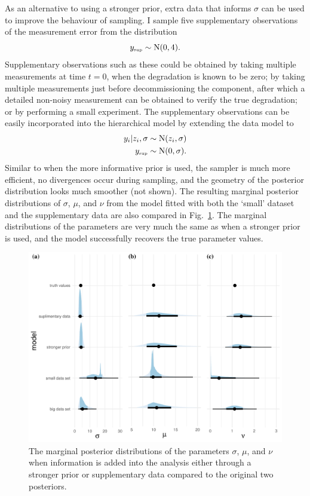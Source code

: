 As an alternative to using a stronger prior, extra data that informs $\sigma$ can be used to improve the behaviour of sampling. I sample five supplementary observations of the measurement error from the distribution
\begin{equation*}
 y_{\text{\tiny{sup}}} \sim \mbox{N}(0, 4).
\end{equation*}
Supplementary observations such as these could be obtained by taking multiple measurements at time $t = 0$, when the degradation is known to be zero; by taking multiple measurements just before decommissioning the component, after which a detailed non-noisy measurement can be obtained to verify the true degradation; or by performing a small experiment. The supplementary observations can be easily incorporated into the hierarchical model by extending the data model to
\begin{align*}
 y_i|z_i, \sigma & \sim \mbox{N}(z_i, \sigma) \\
 y_{\text{\tiny{sup}}} & \sim \mbox{N}(0, \sigma).
\end{align*}
Similar to when the more informative prior is used, the sampler is much more efficient, no divergences occur during sampling, and the geometry of the posterior distribution looks much smoother (not shown). The resulting marginal posterior distributions of $\sigma$, $\mu$, and $\nu$ from the model fitted with both the `small' dataset and the supplementary data are also compared in Fig.~\ref{fig:marginal-post-extra-info}. The marginal distributions of the parameters are very much the same as when a stronger prior is used, and the model successfully recovers the true parameter values.

\begin{figure}[tbp]
  \centering
  \includegraphics[width=0.95\columnwidth]{./figures/ch-4/marginal-post-extra-info.pdf}
  \caption{The marginal posterior distributions of the parameters $\sigma$, $\mu$, and $\nu$ when information is added into the analysis either through a stronger prior or supplementary data compared to the original two posteriors.}
  \label{fig:marginal-post-extra-info}
\end{figure}

